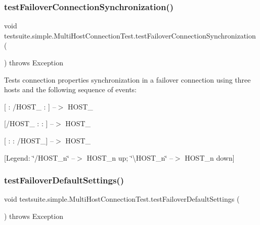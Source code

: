 \subsubsection{\texorpdfstring{test\+Failover\+Connection\+Synchronization()}{testFailoverConnectionSynchronization()}}
{\footnotesize\ttfamily void testsuite.\+simple.\+Multi\+Host\+Connection\+Test.\+test\+Failover\+Connection\+Synchronization (\begin{DoxyParamCaption}{ }\end{DoxyParamCaption}) throws Exception}

Tests connection properties synchronization in a failover connection using three hosts and the following sequence of events\+:
\begin{DoxyItemize}
\item \mbox{[} \+: /\+H\+O\+S\+T\+\_ \+: \mbox{]} --$>$ H\+O\+S\+T\+\_
\item \mbox{[}/\+H\+O\+S\+T\+\_ \+:  \+: \mbox{]} --$>$ H\+O\+S\+T\+\_
\item \mbox{[} \+:  \+: /\+H\+O\+S\+T\+\_\mbox{]} --$>$ H\+O\+S\+T\+\_
\end{DoxyItemize}

\mbox{[}Legend\+: \char`\"{}/\+H\+O\+S\+T\+\_\+n\char`\"{} --$>$ H\+O\+S\+T\+\_\+n up; \char`\"{}\textbackslash{}\+H\+O\+S\+T\+\_\+n\char`\"{} --$>$ H\+O\+S\+T\+\_\+n down\mbox{]} \mbox{\label{classtestsuite_1_1simple_1_1_multi_host_connection_test_ab41d61126e424b0903c7a6411d40a213}} 
\subsubsection{\texorpdfstring{test\+Failover\+Default\+Settings()}{testFailoverDefaultSettings()}}
{\footnotesize\ttfamily void testsuite.\+simple.\+Multi\+Host\+Connection\+Test.\+test\+Failover\+Default\+Settings (\begin{DoxyParamCaption}{ }\end{DoxyParamCaption}) throws Exception}

